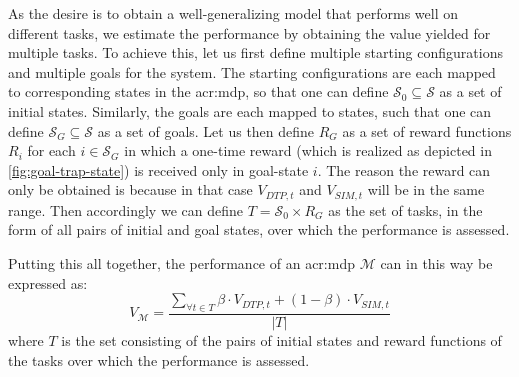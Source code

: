 As the desire is to obtain a well-generalizing model that performs well on different tasks, we estimate the performance by obtaining the value yielded for multiple tasks.
To achieve this, let us first define multiple starting configurations and multiple goals for the system.
The starting configurations are each mapped to corresponding states in the \acrshort{acr:mdp}, so that one can define $\mathcal{S}_0 \subseteq \mathcal{S}$ as a set of initial states.
Similarly, the goals are each mapped to states, such that one can define $\mathcal{S}_G \subseteq \mathcal{S}$ as a set of goals.
Let us then define $R_G$ as a set of reward functions $R_i$ for each $i \in \mathcal{S}_G$ in which a one-time reward (which is realized as depicted in \autoref{fig:goal-trap-state}) is received only in goal-state $i$.
The reason the reward can only be obtained is because in that case $V_{\mathit{DTP}, t}$ and $V_{\mathit{SIM}, t}$ will be in the same range.
Then accordingly we can define $T = \mathcal{S_0} \times R_G$ as the set of tasks, in the form of all pairs of initial and goal states, over which the performance is assessed.

\noindent Putting this all together, the performance of an \acrshort{acr:mdp} $\mathcal{M}$ can in this way be expressed as:
\begin{equation}
	V_{\mathcal{M}} = \frac{\sum_{\forall t \in T} \beta \cdot V_{\mathit{DTP}, t} + (1 - \beta) \cdot V_{\mathit{SIM}, t}}{|T|}
\end{equation}
where $T$ is the set consisting of the pairs of initial states and reward functions of the tasks over which the performance is assessed.


%

